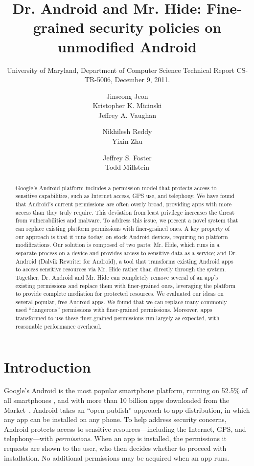\documentclass[preprint]{sig-alternate-10pt}
\title{Dr. Android and Mr. Hide: Fine-grained security policies on unmodified Android}
\author{
\alignauthor
Jinseong Jeon\titlenote{University of Maryland, College Park}\\
      \email{jsjeon@cs.umd.edu}
\alignauthor
Kristopher K. Micinski\raisebox{10pt}{$\ast$}\\
       \email{micinski@cs.umd.edu}
\alignauthor
Jeffrey A. Vaughan\titlenote{University of California, Los Angeles}\\
       \email{jeff@cs.ucla.edu}
\and
\alignauthor
Nikhilesh Reddy\raisebox{10pt}{$\dagger$}\\
       \email{nreddy@cs.ucla.edu}
\alignauthor
Yixin Zhu\raisebox{10pt}{$\dagger$}\\
       \email{}
\and
\alignauthor
Jeffrey S. Foster\raisebox{10pt}{$\ast$}\\
       \email{jfoster@cs.umd.edu}
\alignauthor
Todd Millstein\raisebox{10pt}{$\dagger$}\\
       \email{todd@cs.ucla.edu}
}
\subtitle{\small University of Maryland, Department of Computer
  Science Technical Report CS-TR-5006, December 9, 2011.}
\newcommand{\comment}[3][\color{red}]{}%
\newcommand{\tdm}[1]{\comment[\color{red}]{TDM}{#1}}
\begin{document}
\maketitle

\begin{abstract}
  Google's Android platform includes a permission model that protects
  access to sensitive capabilities, such as Internet access, GPS use,
  and telephony. We have found that Android's current permissions are
  often overly broad, providing apps with more access than they truly
  require. This deviation from least privilege increases the threat
  from vulnerabilities and malware. To address this issue, we present
  a novel system that can replace existing platform permissions with
  finer-grained ones. A key property of our approach is that it runs
  today, on stock Android devices, requiring no platform
  modifications. Our solution is composed of two parts: Mr. Hide,
  which runs in a separate process on a device and provides access to
  sensitive data as a service; and Dr. Android (Dalvik Rewriter for
  Android), a tool that transforms existing Android apps to access
  sensitive resources via Mr. Hide rather than directly through the
  system. Together, Dr. Android and Mr. Hide can completely remove
  several of an app's existing permissions and replace them with finer-grained
  ones, leveraging the platform to provide complete mediation for
  protected resources. We evaluated our ideas on
  several popular, free Android apps. We found that we can
  replace many commonly used ``dangerous'' permissions with
  finer-grained permissions. Moreover, apps transformed to use these
  finer-grained permissions run largely as expected, with reasonable
  performance overhead.
\end{abstract}

\section{Introduction}

Google's Android is the most popular smartphone platform, running on
52.5\% of all smartphones \cite{gartner:q311}, and with more than 10
billion apps downloaded from the Market~\cite{website:google-blog}.
%
Android takes an ``open-publish'' approach to app
distribution, in which any app can be installed on any phone.
To help address security concerns, Android protects access to
sensitive resources---including the Internet, GPS, and telephony---with
\emph{permissions}.  When an app is installed, the permissions it
requests are shown to the user, who then decides whether to proceed
with installation.  No additional permissions may be acquired when
an app runs.
\end{document}
